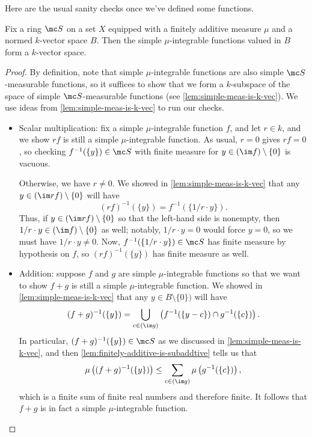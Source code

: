 \documentclass[../notes.tex]{subfiles}
\begin{document}
Here are the usual sanity checks once we've defined some functions.
\begin{lemma} \label{lem:simple-int-is-k-vec}
	Fix a ring $\mc S$ on a set $X$ equipped with a finitely additive measure $\mu$ and a normed $k$-vector space $B$. Then the simple $\mu$-integrable functions valued in $B$ form a $k$-vector space.
\end{lemma}
\begin{proof}
	By definition, note that simple $\mu$-integrable functions are also simple $\mc S$-measurable functions, so it suffices to show that we form a $k$-subspace of the space of simple $\mc S$-measurable functions (see \autoref{lem:simple-meas-is-k-vec}). We use ideas from \autoref{lem:simple-meas-is-k-vec} to run our checks.
	\begin{itemize}
		\item Scalar multiplication: fix a simple $\mu$-integrable function $f$, and let $r\in k$, and we show $rf$ is still a simple $\mu$-integrable function. As usual, $r=0$ gives $rf=0$, so checking $f^{-1}(\{y\})\in\mc S$ with finite measure for $y\in(\im f)\setminus\{0\}$ is vacuous.

		Otherwise, we have $r\ne0$. We showed in \autoref{lem:simple-meas-is-k-vec} that any $y\in(\im rf)\setminus\{0\}$ will have
		\[(rf)^{-1}(\{y\})=f^{-1}(\{1/r\cdot y\}).\]
		Thus, if $y\in(\im rf)\setminus\{0\}$ so that the left-hand side is nonempty, then $1/r\cdot y\in(\im f)\setminus\{0\}$ as well; notably, $1/r\cdot y=0$ would force $y=0$, so we must have $1/r\cdot y\ne0$. Now, $f^{-1}(\{1/r\cdot y\})\in\mc S$ has finite measure by hypothesis on $f$, so $(rf)^{-1}(\{y\})$ has finite measure as well.

		\item Addition: suppose $f$ and $g$ are simple $\mu$-integrable functions so that we want to show $f+g$ is still a simple $\mu$-integrable function. We showed in \autoref{lem:simple-meas-is-k-vec} that any $y\in B\setminus\{0\})$ will have
		\[(f+g)^{-1}(\{y\})=\bigcup_{c\in(\im g)}\left(f^{-1}(\{y-c\})\cap g^{-1}(\{c\})\right).\]
		In particular, $(f+g)^{-1}(\{y\})\in\mc S$ as we discussed in \autoref{lem:simple-meas-is-k-vec}, and then \autoref{lem:finitely-additive-is-subaddtive} tells us that
		\[\mu\left((f+g)^{-1}(\{y\})\right)\le\sum_{c\in(\im g)}\mu\left(g^{-1}(\{c\})\right),\]
		which is a finite sum of finite real numbers and therefore finite. It follows that $f+g$ is in fact a simple $\mu$-integrable function.
		\qedhere
	\end{itemize}
\end{proof}
\end{document}
